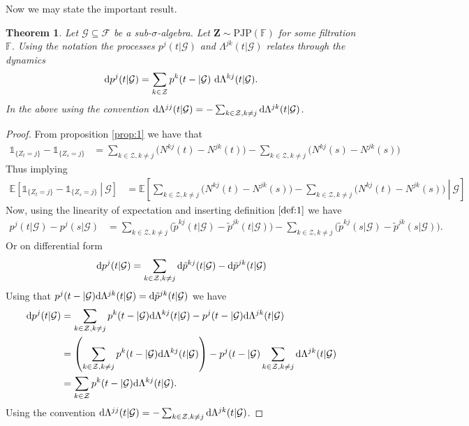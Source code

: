 \documentclass[12pt,letter,twoside]{article}
\theoremstyle{plain}
\newtheorem{theorem}{Theorem}
\theoremstyle{definition}
\theoremstyle{remark}
\begin{document}
Now we may state the important result.
\begin{theorem}\label{thm:1}
Let $\mathcal G\subseteq\mathcal F$ be a sub-$\sigma$-algebra. Let $\mathbf Z\sim \text{PJP}(\mathbb F)$ for some filtration $\mathbb F$. Using the notation the processes $p^j(t\vert \mathcal G)$ and $\Lambda^{jk}(t\vert \mathcal G)$ relates through the dynamics
\begin{align}
\text d p^{j}(t\vert \mathcal G)=\sum_{k\in\mathcal Z} p^{k}(t-\vert\mathcal G)\ \text d\Lambda^{kj}(t\vert\mathcal G).
\end{align}
In the above using the convention $\text d\Lambda^{jj}(t\vert\mathcal G)=-\sum_{k\in\mathcal Z, k\ne j}\text d\Lambda^{jk}(t\vert\mathcal G)$.
\end{theorem}
\begin{proof}
From proposition \ref{prop:1} we have that
\begin{align}
\mathds 1_{\{Z_t=j\}}-\mathds 1_{\{Z_s=j\}}&=\sum_{k\in\mathcal Z, k\ne j}\Big(N^{kj}(t)-N^{jk}(t)\Big)-\sum_{k\in\mathcal Z, k\ne j}\Big(N^{kj}(s)-N^{jk}(s)\Big)
\end{align}
Thus implying
\begin{align}
\mathbb E\left[\left.\mathds 1_{\{Z_t=j\}}-\mathds 1_{\{Z_s=j\}} \ \right\vert\ \mathcal G\right]&=\mathbb E\left[\left.\sum_{k\in\mathcal Z, k\ne j}\Big(N^{kj}(t)-N^{jk}(s)\Big)-\sum_{k\in\mathcal Z, k\ne j}\Big(N^{kj}(t)-N^{jk}(s)\Big)\ \right\vert\ \mathcal G\right]
\end{align}
Now, using the linearity of expectation and inserting definition $\ref{def:1}$ we have
\begin{align}
p^j(t\vert\mathcal G)-p^j(s\vert\mathcal G)&=\sum_{k\in\mathcal Z, k\ne j}\Big(\tilde p^{kj}(t\vert\mathcal G)-\tilde p^{jk}(t\vert\mathcal G)\Big)-\sum_{k\in\mathcal Z, k\ne j}\Big(\tilde p^{kj}(s\vert\mathcal G)-\tilde p^{jk}(s\vert\mathcal G)\Big).
\end{align}
Or on differential form
\begin{align}
\text dp^j(t\vert \mathcal G)=\sum_{k\in\mathcal Z, k\ne j} \text d\tilde p^{kj}(t\vert \mathcal G)-\text d\tilde p^{jk}(t\vert \mathcal G)
\end{align}
Using that $p^{j}(t-\vert\mathcal G)\text d\Lambda^{jk}(t\vert\mathcal G)=\text d\tilde p^{jk}(t\vert\mathcal G)$ we have
\begin{align}
\text dp^j(t\vert \mathcal G)&=\sum_{k\in\mathcal Z, k\ne j} p^{k}(t-\vert\mathcal G)\text d\Lambda^{kj}(t\vert\mathcal G)-p^{j}(t-\vert\mathcal G)\text d\Lambda^{jk}(t\vert\mathcal G)\\
&=\left(\sum_{k\in\mathcal Z, k\ne j} p^{k}(t-\vert\mathcal G)\text d\Lambda^{kj}(t\vert\mathcal G)\right)-p^{j}(t-\vert\mathcal G)\sum_{k\in\mathcal Z, k\ne j}\text d\Lambda^{jk}(t\vert\mathcal G)\\
&=\sum_{k\in\mathcal Z} p^k(t-\vert\mathcal G)\text d\Lambda^{kj}(t\vert\mathcal G).
\end{align}
Using the convention $\text d\Lambda^{jj}(t\vert\mathcal G)=-\sum_{k\in\mathcal Z, k\ne j}\text d\Lambda^{jk}(t\vert\mathcal G)$.
\end{proof}
\end{document}
